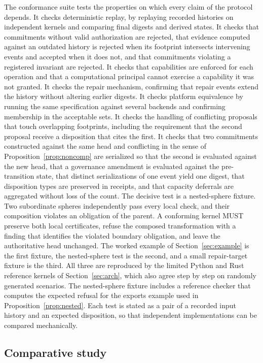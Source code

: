 \documentclass[11pt]{article}
\theoremstyle{remark}
\begin{document}
The conformance suite tests the properties on which every claim of the protocol depends. It checks deterministic replay, by replaying recorded histories on independent kernels and comparing final digests and derived states. It checks that commitments without valid authorization are rejected, that evidence computed against an outdated history is rejected when its footprint intersects intervening events and accepted when it does not, and that commitments violating a registered invariant are rejected. It checks that capabilities are enforced for each operation and that a computational principal cannot exercise a capability it was not granted. It checks the repair mechanism, confirming that repair events extend the history without altering earlier digests. It checks platform equivalence by running the same specification against several backends and confirming membership in the acceptable sets. It checks the handling of conflicting proposals that touch overlapping footprints, including the requirement that the second proposal receive a disposition that cites the first. It checks that two commitments constructed against the same head and conflicting in the sense of Proposition~\ref{prop:noncomp} are serialized so that the second is evaluated against the new head, that a governance amendment is evaluated against the pre-transition state, that distinct serializations of one event yield one digest, that disposition types are preserved in receipts, and that capacity deferrals are aggregated without loss of the count. The decisive test is a nested-sphere fixture. Two subordinate spheres independently pass every local check, and their composition violates an obligation of the parent. A conforming kernel MUST preserve both local certificates, refuse the composed transformation with a finding that identifies the violated boundary obligation, and leave the authoritative head unchanged. The worked example of Section~\ref{sec:example} is the first fixture, the nested-sphere test is the second, and a small repair-target fixture is the third. All three are reproduced by the limited Python and Rust reference kernels of Section~\ref{sec:arch}, which also agree step by step on randomly generated scenarios. The nested-sphere fixture includes a reference checker that computes the expected refusal for the exports example used in Proposition~\ref{prop:nested}. Each test is stated as a pair of a recorded input history and an expected disposition, so that independent implementations can be compared mechanically.

\subsection{Comparative study}
\end{document}
